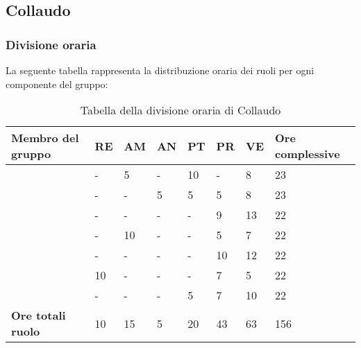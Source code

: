 \subsection{Collaudo}

\subsubsection{Divisione oraria}
La seguente tabella rappresenta la distribuzione oraria dei ruoli per ogni componente del gruppo:
{

\renewcommand{\arraystretch}{2}
\begin{longtable}[h!] { C{4cm} C{1cm} C{1cm} C{1cm} C{1cm} C{1cm} C{1cm} C{3cm}}
\caption{Tabella della divisione oraria di Collaudo}	\\
\rowcolor{\primaryColor}

\textcolor{\secondaryColor}{\textbf{Membro del gruppo}} & 
\textcolor{\secondaryColor}{\textbf{RE}} & 
\textcolor{\secondaryColor}{\textbf{AM}} & 
\textcolor{\secondaryColor}{\textbf{AN}} & 
\textcolor{\secondaryColor}{\textbf{PT}} & 
\textcolor{\secondaryColor}{\textbf{PR}} & 
\textcolor{\secondaryColor}{\textbf{VE}} & 
\textcolor{\secondaryColor}{\textbf{Ore complessive}}\\	
\endhead

\AW{}                     &  - &  5 &  - & 10 & - & 8 & 23 \\
\AT{}                     &  - &  - &  5 & 5 & 5 & 8 & 23 \\
\AD{}                     &  - &  - &  - & - & 9 & 13 & 22 \\
\EC{}                     &  - &  10 &  - & - & 5 & 7 & 22 \\
\EM{}                     &  - &  - &  - & - & 10 & 12 & 22 \\
\FP{}                     & 10 & - &  - & - & 7 & 5 & 22 \\
\GG{}                     &  - &  - &  - & 5 & 7 & 10 & 22 \\
\textbf{Ore totali ruolo} & 10 & 15 & 5 & 20 & 43 & 63 & 156 \\

\end{longtable}
}


